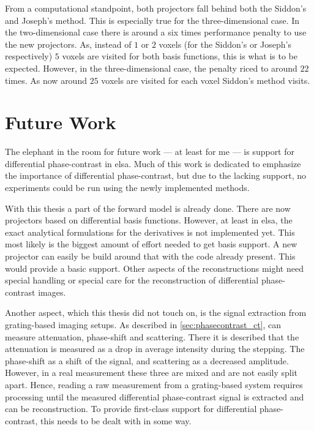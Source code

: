 From a computational standpoint, both projectors fall behind both the Siddon's and Joseph's method.
This is especially true for the three-dimensional case. In the two-dimensional case there is around
a six times performance penalty to use the new projectors. As, instead of \(1\) or \(2\) voxels (for
the Siddon's or Joseph's respectively) \(5\) voxels are visited for both basis functions, this is
what is to be expected. However, in the three-dimensional case, the penalty riced to around \(22\)
times. As now around \(25\) voxels are visited for each voxel Siddon's method visits.

\chapter{Future Work}\label{chap:future_work}

The elephant in the room for future work --- at least for me --- is support for differential
phase-contrast in elsa. Much of this work is dedicated to emphasize the importance of differential
phase-contrast, but due to the lacking support, no experiments could be run using the newly
implemented methods.

With this thesis a part of the forward model is already done. There are now projectors based on
differential basis functions. However, at least in elsa, the exact analytical formulations for the
derivatives is not implemented yet. This most likely is the biggest amount of effort needed to get
basis support. A new projector can easily be build around that with the code already present. This
would provide a basic support. Other aspects of the reconstructions might need special handling or
special care for the reconstruction of differential phase-contrast images.

Another aspect, which this thesis did not touch on, is the signal extraction from grating-based
imaging setups. As described in \autoref{sec:phasecontrast_ct}, can measure attenuation, phase-shift
and scattering. There it is described that the attenuation is measured as a drop in average
intensity during the stepping. The phase-shift as a shift of the signal, and scattering as a
decreased amplitude. However, in a real measurement these three are mixed and are not easily split
apart. Hence, reading a raw measurement from a grating-based system requires processing until the
measured differential phase-contrast signal is extracted and can be reconstruction. To provide
first-class support for differential phase-contrast, this needs to be dealt with in some way.

